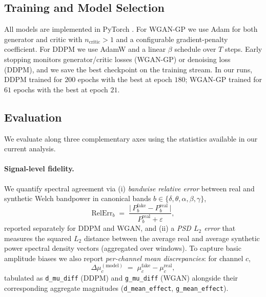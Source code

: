 \documentclass{article}
\begin{document}
\subsection{Training and Model Selection}
All models are implemented in PyTorch \citep{paszke2019pytorch}. For WGAN-GP we use Adam \citep{kingma2015adam} for both generator and critic with $n_{\text{critic}}>1$ and a configurable gradient-penalty coefficient. For DDPM we use AdamW \citep{loshchilov2019decoupled} and a linear $\beta$ schedule over $T$ steps. Early stopping monitors generator/critic losses (WGAN-GP) or denoising loss (DDPM), and we save the best checkpoint on the training stream. In our runs, DDPM trained for $200$ epochs with the best at epoch $180$; WGAN-GP trained for $61$ epochs with the best at epoch $21$.

\subsection{Evaluation}
We evaluate along three complementary axes using the statistics available in our current analysis.

\paragraph{Signal-level fidelity.}
We quantify spectral agreement via (i) \emph{bandwise relative error} between real and synthetic Welch bandpower in canonical bands $b\in\{\delta,\theta,\alpha,\beta,\gamma\}$,
\[
\mathrm{RelErr}_b \;=\; \frac{\big|\,P_b^{\text{fake}} - P_b^{\text{real}}\,\big|}{P_b^{\text{real}}+\varepsilon},
\]
reported separately for DDPM and WGAN, and (ii) a \emph{PSD $L_2$ error} that measures the squared $L_2$ distance between the average real and average synthetic power spectral density vectors (aggregated over windows). To capture basic amplitude biases we also report \emph{per-channel mean discrepancies}: for channel $c$, 
\[
\Delta\mu_c^{(\text{model})} \;=\; \mu^{\text{fake}}_c - \mu^{\text{real}}_c,
\]
tabulated as \texttt{d\_mu\_diff} (DDPM) and \texttt{g\_mu\_diff} (WGAN) alongside their corresponding aggregate magnitudes (\texttt{d\_mean\_effect}, \texttt{g\_mean\_effect}).
\end{document}
